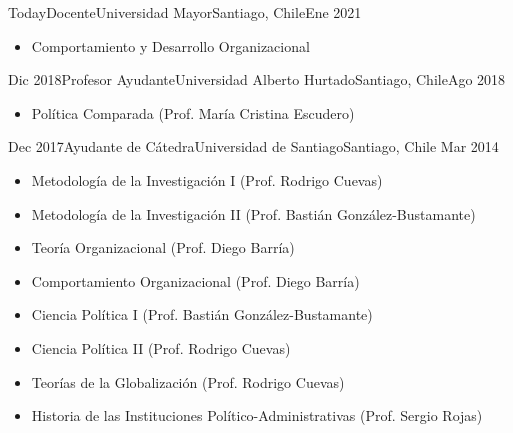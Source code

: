 





\begin{experiences}
  \experience
    {Today}{Docente}{Universidad Mayor}{Santiago, Chile}{Ene 2021}
    {\begin{itemize}
    \item Comportamiento y Desarrollo Organizacional
    \end{itemize}}
    {}
\end{experiences}
\vspace{-2mm}

\begin{experiences}
  \experience
    {Dic 2018}{Profesor Ayudante}{Universidad Alberto Hurtado}{Santiago, Chile}{Ago 2018}
    {\begin{itemize}
    \item Política Comparada {\small (Prof. María Cristina Escudero)}
    \end{itemize}}
    {}
\end{experiences}
\vspace{-2mm}

\begin{experiences}
  \emptySeparator 
  \experience 
    {Dec 2017}{Ayudante de Cátedra}{Universidad de Santiago}{Santiago, Chile} {Mar 2014}
    {\begin{itemize}
    \item Metodología de la Investigación I {\small (Prof. Rodrigo Cuevas)}
    \item Metodología de la Investigación II {\small (Prof. Bastián González-Bustamante)}
    \item Teoría Organizacional {\small (Prof. Diego Barría)}
    \item Comportamiento Organizacional {\small (Prof. Diego Barría)}
    \item Ciencia Política I {\small (Prof. Bastián González-Bustamante)}
    \item Ciencia Política II {\small (Prof. Rodrigo Cuevas)}
	\item Teorías de la Globalización {\small (Prof. Rodrigo Cuevas)}
	\item Historia de las Instituciones Político-Administrativas {\small (Prof. Sergio Rojas)}
    \end{itemize}}
    {}
\end{experiences}
\vspace{-2mm}

